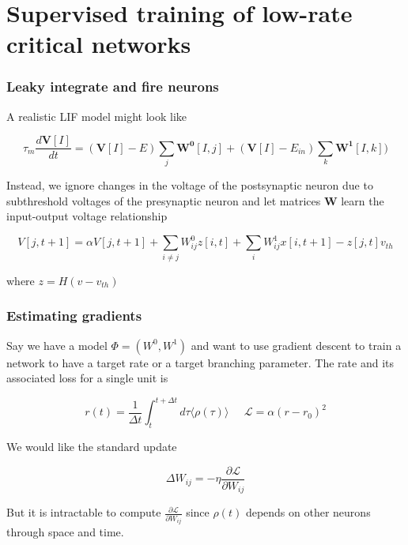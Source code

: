 \documentclass{beamer}
\begin{document}
\section{Supervised training of low-rate critical networks} 

\begin{frame}[plain]
\frametitle{Leaky integrate and fire neurons} 

A realistic LIF model might look like

\begin{equation*}
\tau_{m}\frac{d\mathbf{V}[I]}{dt} = (\mathbf{V}[I]-E)\sum_{j} \mathbf{W^{0}}[I,j] + (\mathbf{V}[I] - E_{in})\sum_{k}\mathbf{W^{1}}[I,k])
\end{equation*}

Instead, we ignore changes in the voltage of the postsynaptic neuron due to subthreshold voltages of the presynaptic neuron and let matrices $\mathbf{W}$ learn the input-output voltage relationship

\begin{equation*}
V[j,t+1] = \alpha V[j,t+1] + \sum_{i\neq j} W^{0}_{ij}z[i,t] + \sum_{i} W^{1}_{ij}x[i,t+1] - z[j,t]v_{th} 
\end{equation*}

where $z = H(v-v_{th})$


\end{frame}


\begin{frame}[plain]
\frametitle{Estimating gradients} 

Say we have a model $\Phi = (W^{0},W^{1})$ and want to use gradient descent to train a network to have a target rate or a target branching parameter. The rate and its associated loss for a single unit is

\begin{equation*}
r(t) = \frac{1}{\Delta t}\int_{t}^{t+\Delta t} d\tau \langle \rho(\tau)\rangle\;\;\;\;\;\mathcal{L} = \alpha(r-r_{0})^{2}
\end{equation*}

We would like the standard update 

\begin{equation*}
\Delta W_{ij} = -\eta \frac{\partial\mathcal{L}}{\partial W_{ij}}
\end{equation*}


But it is intractable to compute $\frac{\partial\mathcal{L}}{\partial W_{ij}}$ since $\rho(t)$ depends on other neurons through space and time.


\end{frame}
\end{document}
